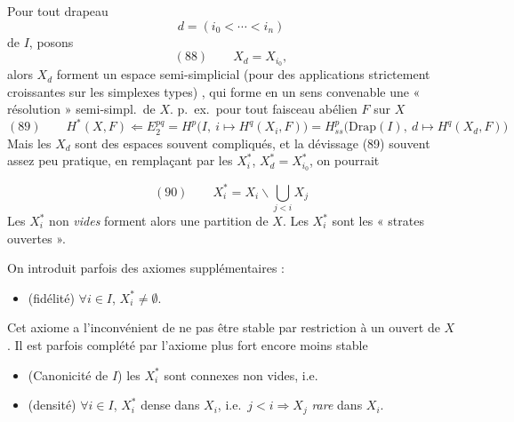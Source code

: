 \documentclass[11pt,a4paper]{article}
\begin{document}
 Pour tout drapeau
\[
d=(i_0<\cdots<i_n)
\]
de $I$, posons
\[
(88)\qquad X_d=X_{i_0},
\]
alors  $X_d$ forment un  espace semi-simplicial \struck{\ill{}} (pour des applications strictement croissantes sur les simplexes types) , qui forme en un sens convenable une « résolution » semi-simpl.\ de $X$.  p.\ ex.\ pour tout faisceau abélien $F$ sur $X$
\[
(89)\qquad H^{*}(X,F)\Longleftarrow E_2^{pq}=H^p\big(I,\ i\mapsto H^q(X_i,F)\big)=H^p_{ss}\big(\mathrm{Drap}(I),\ d\mapsto H^q(X_d,F)\big)
\]
Mais les  $X_d$ sont des espaces souvent compliqués, et la dévissage (89) souvent assez peu pratique, en remplaçant par les $X_i^{*}$, $X_d^{*}=X^{*}_{i_0}$, on pourrait


\[
(90)\qquad X_i^{*}=X_i\smallsetminus\bigcup_{j<i}X_j
\]
Les $X_i^{*}$ non \emph{vides} forment alors une partition de $X$. Les $X_i^{*}$ sont les « strates ouvertes ».

On introduit parfois des axiomes supplémentaires :
\begin{itemize}
\item[(Strat 4)] (fidélité) \quad $\forall i\in I$, $X_i^{*}\ne\emptyset$.
\end{itemize}
Cet axiome a l'inconvénient de ne pas être stable par restriction à un ouvert de $X$. Il est parfois complété par l'axiome plus fort encore moins stable
\begin{itemize}
\item[(Strat 4 bis)] (Canonicité de $I$) les $X_i^{*}$ sont connexes non vides, i.e.
\item[(Strat 5)] (densité) $\forall i\in I$, $X_i^{*}$ dense dans $X_i$,  i.e.\ $j<i\Rightarrow X_j$ \emph{rare} dans $X_i$.
\end{itemize}

\end{document}
